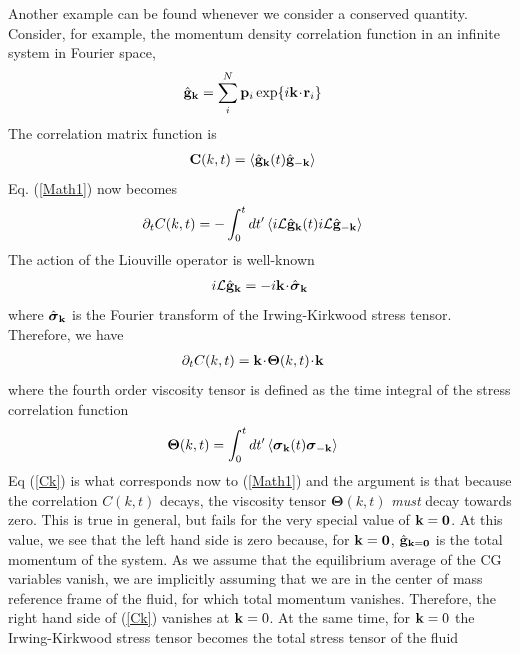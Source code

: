 \documentclass[a4paper,openright,12pt]{book}
\newcommand{\esc}{\!\cdot\!}
\newcommand{\llangle}{\left\langle}
\newcommand{\rrangle}{\right\rangle}
\begin{document}
{Another example  can be  found whenever  we consider  a
conserved  quantity.  Consider,  for  example,  the  momentum  density
correlation function in an infinite system in Fourier space,
\begin{align}
\hat{\bf g}_{\bf k}&=\sum_i^N{\bf p}_i\exp\{i{\bf k}\esc{\bf r}_i\}
\end{align}
The correlation matrix function is
\begin{align}
  {\bf C}(k,t)&=\llangle \hat{\bf g}_{\bf k}(t)\hat{\bf g}_{-{\bf k}}\rrangle
\end{align}
Eq. (\ref{Math1}) now becomes
\begin{align}
\partial_t  C(k,t)&=-\int_0^tdt'\llangle i{\cal L} \hat{\bf g}_{\bf k}(t) i{\cal L}\hat{\bf g}_{-{\bf k}}\rrangle
\end{align}
The action of the Liouville operator is well-known
\begin{align}
  i{\cal L}\hat{\bf g}_{\bf k}=-i{\bf k}\esc\hat{\boldsymbol{\sigma}}_{\bf k}
\end{align}
where $\hat{\boldsymbol{\sigma}}_{\bf k}$ is the Fourier transform of the Irwing-Kirkwood
stress tensor.  Therefore, we have
\begin{align}
\partial_t  C(k,t)&={\bf k}\esc\boldsymbol{\Theta}(k,t)\esc {\bf k}
\label{Ck}
\end{align}
where the fourth order viscosity tensor is defined as the time integral of the
stress correlation function
\begin{align}
\boldsymbol{\Theta}(k,t)&=  \int_0^tdt'\llangle \boldsymbol{\sigma}_{\bf k}(t) \boldsymbol{\sigma}_{-{\bf k}}\rrangle
\label{Theta}
\end{align}
Eq  (\ref{Ck})  is  what  corresponds now  to  (\ref{Math1})  and  the
argument  is  that  because   the  correlation  $C(k,t)$  decays,  the
viscosity   tensor   $\boldsymbol{\Theta}(k,t)$  \textit{must}   decay
towards zero.   This is  true in  general, but  fails for  the very special
value of ${\bf k}={\bf 0}$.  At this  value, we see that the left hand
side is zero because, for ${\bf k}={\bf 0}$, $\hat{\bf g}_{{\bf k}=\bf 0}$ is
the total momentum  of the system.  As we assume  that the equilibrium
average of the CG variables vanish, we are implicitly assuming that we
are in  the center  of mass  reference frame of  the fluid,  for which
total momentum vanishes.  Therefore, the right hand  side of (\ref{Ck})
vanishes at  ${\bf k}=0$.  At the same time, for  ${\bf k}=0$  the Irwing-Kirkwood
stress tensor becomes the total stress tensor of the fluid
\begin{align}

\end{align}}
\end{document}

